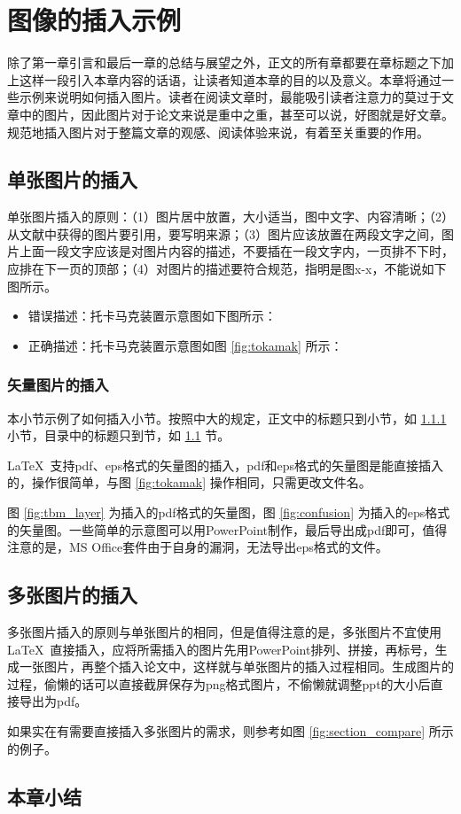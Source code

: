 \chapter{图像的插入示例}
\label{cha:fig_example}
除了第一章引言和最后一章的总结与展望之外，正文的所有章都要在章标题之下加上这样一段引入本章内容的话语，让读者知道本章的目的以及意义。本章将通过一些示例来说明如何插入图片。读者在阅读文章时，最能吸引读者注意力的莫过于文章中的图片，因此图片对于论文来说是重中之重，甚至可以说，好图就是好文章。规范地插入图片对于整篇文章的观感、阅读体验来说，有着至关重要的作用。
\section{单张图片的插入}
\label{sec:fig_singlefig}
单张图片插入的原则：（1）图片居中放置，大小适当，图中文字、内容清晰；（2）从文献中获得的图片要引用，要写明来源；（3）图片应该放置在两段文字之间，图片上面一段文字应该是对图片内容的描述，不要插在一段文字内，一页排不下时，应排在下一页的顶部；（4）对图片的描述要符合规范，指明是图x-x，不能说如下图所示。
\begin{itemize}
\item 错误描述：托卡马克装置示意图如下图所示\cite{xu2016general}：
\item 正确描述：托卡马克装置示意图如图 \ref{fig:tokamak} 所示\cite{xu2016general}：
\end{itemize}


\subsection{矢量图片的插入}
\label{ssec:fig_vecfig}
本小节示例了如何插入小节。按照中大的规定，正文中的标题只到小节，如 \ref{ssec:fig_vecfig} 小节，目录中的标题只到节，如 \ref{sec:fig_singlefig} 节。

\LaTeX\  支持pdf、eps格式的矢量图的插入，pdf和eps格式的矢量图是能直接插入的，操作很简单，与图 \ref{fig:tokamak} 操作相同，只需更改文件名。

图 \ref{fig:tbm_layer} 为插入的pdf格式的矢量图，图 \ref{fig:confusion} 为插入的eps格式的矢量图。一些简单的示意图可以用PowerPoint制作，最后导出成pdf即可，值得注意的是，MS Office套件由于自身的漏洞，无法导出eps格式的文件。


\section{多张图片的插入}
\label{sec:fig_multifig}
多张图片插入的原则与单张图片的相同，但是值得注意的是，多张图片不宜使用\LaTeX\ 直接插入，应将所需插入的图片先用PowerPoint排列、拼接，再标号，生成一张图片，再整个插入论文中，这样就与单张图片的插入过程相同。生成图片的过程，偷懒的话可以直接截屏保存为png格式图片，不偷懒就调整ppt的大小后直接导出为pdf。



如果实在有需要直接插入多张图片的需求，则参考如图 \ref{fig:section_compare} 所示的例子。

\section{本章小结}
